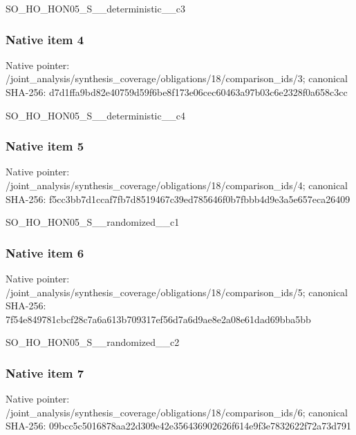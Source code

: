 \documentclass[10pt,a4paper]{article}
\begin{document}
\begingroup\raggedright\sloppy SO\_\allowbreak{}HO\_\allowbreak{}HON05\_\allowbreak{}S\_\allowbreak{}\_\allowbreak{}deterministic\_\allowbreak{}\_\allowbreak{}c3\par\endgroup

\subsubsection{Native item 4}
Native pointer: /joint\_\allowbreak{}analysis/synthesis\_\allowbreak{}coverage/obligations/18/comparison\_\allowbreak{}ids/3; canonical SHA-256: d7d1ffa9bd82e40759d59f6be8f173e06cec60463a97b03c6e2328f0a658c3cc

\begingroup\raggedright\sloppy SO\_\allowbreak{}HO\_\allowbreak{}HON05\_\allowbreak{}S\_\allowbreak{}\_\allowbreak{}deterministic\_\allowbreak{}\_\allowbreak{}c4\par\endgroup

\subsubsection{Native item 5}
Native pointer: /joint\_\allowbreak{}analysis/synthesis\_\allowbreak{}coverage/obligations/18/comparison\_\allowbreak{}ids/4; canonical SHA-256: f5cc3bb7d1ccaf7fb7d8519467c39ed785646f0b7fbbb4d9e3a5e657eca26409

\begingroup\raggedright\sloppy SO\_\allowbreak{}HO\_\allowbreak{}HON05\_\allowbreak{}S\_\allowbreak{}\_\allowbreak{}randomized\_\allowbreak{}\_\allowbreak{}c1\par\endgroup

\subsubsection{Native item 6}
Native pointer: /joint\_\allowbreak{}analysis/synthesis\_\allowbreak{}coverage/obligations/18/comparison\_\allowbreak{}ids/5; canonical SHA-256: 7f54e849781cbcf28c7a6a613b709317ef56d7a6d9ae8e2a08e61dad69bba5bb

\begingroup\raggedright\sloppy SO\_\allowbreak{}HO\_\allowbreak{}HON05\_\allowbreak{}S\_\allowbreak{}\_\allowbreak{}randomized\_\allowbreak{}\_\allowbreak{}c2\par\endgroup

\subsubsection{Native item 7}
Native pointer: /joint\_\allowbreak{}analysis/synthesis\_\allowbreak{}coverage/obligations/18/comparison\_\allowbreak{}ids/6; canonical SHA-256: 09bcc5c5016878aa22d309e42e356436902626f614e9f3e7832622f72a73d791
\end{document}
